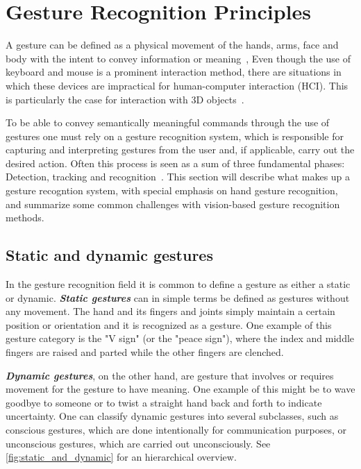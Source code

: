 
\section{Gesture Recognition Principles}
A gesture can be defined as a physical movement of the hands, arms, face and body with the intent to convey information or meaning~\citep{Mitra2007}, 
Even though the use of keyboard and mouse is a prominent interaction method, there are situations in which
these devices are impractical for human-computer interaction (HCI). This is particularly the case for interaction with 3D objects~\citep{Rautaray2015}. 

To be able to convey semantically meaningful commands through the use of gestures one must rely on a gesture recognition system, 
which is responsible for capturing and interpreting gestures from the user and, if applicable, carry out the desired action. 
Often this process is seen as a sum of three fundamental phases: Detection, tracking and recognition~\citep{Rautaray2015}.
This section will describe what makes up a gesture recogntion system, with special emphasis on hand gesture recognition, and
summarize some common challenges with vision-based gesture recognition methods.

\subsection{Static and dynamic gestures}
In the gesture recognition field it is common to define a gesture as either a static or dynamic. \textbf{\textit{Static gestures}} can in simple terms be defined as gestures
without any movement. The hand and its fingers and joints simply maintain a certain position or orientation and it is recognized as a gesture. One example 
of this gesture category is the "V sign" (or the "peace sign"), where the index and middle fingers are raised and parted while the other fingers are clenched.

\textbf{\textit{Dynamic gestures}}, on the other hand, are gesture that involves or requires movement for the gesture to have meaning. One example of this
might be to wave goodbye to someone or to twist a straight hand back and forth to indicate uncertainty. One can classify dynamic gestures into several 
subclasses, such as conscious gestures, which are done intentionally for communication purposes, or unconscious gestures, which are carried out unconsciously.
See \ref{fig:static_and_dynamic} for an hierarchical overview.

